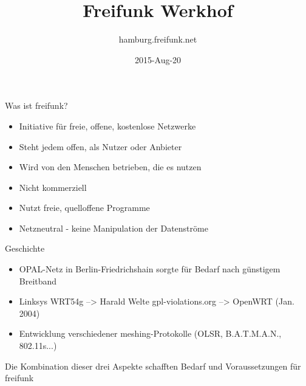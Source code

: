 \documentclass[t]{beamer}
\title{Freifunk Werkhof}
\author{hamburg.freifunk.net}
\date{2015-Aug-20}
\begin{document}
\maketitle

\begin{frame}{Was ist freifunk?}
	\begin{itemize}
		\item Initiative für freie, offene, kostenlose Netzwerke
		\item Steht jedem offen, als Nutzer oder Anbieter
		\item Wird von den Menschen betrieben, die es nutzen
		\item Nicht kommerziell
		\item Nutzt freie, quelloffene Programme
		\item Netzneutral - keine Manipulation der Datenströme		
	\end{itemize}
\end{frame}


\begin{frame}{Geschichte}
	\begin{itemize}
		\item OPAL-Netz in Berlin-Friedrichshain sorgte für Bedarf nach günstigem Breitband
		\item Linksys WRT54g --> Harald Welte gpl-violations.org --> OpenWRT (Jan. 2004)
		\item Entwicklung verschiedener meshing-Protokolle (OLSR, B.A.T.M.A.N., 802.11s...)
	\end{itemize}
	\begin{center}
		Die Kombination dieser drei Aspekte schafften Bedarf und Voraussetzungen für freifunk
	\end{center}
\end{frame}
\end{document}
